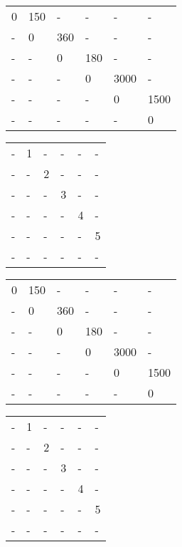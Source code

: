\documentclass[11pt]{article}
\begin{document}
\begin{sol}
\begin{table*}[htbp]
	\centering
	\begin{tabular}{|l|l|l|l|l|l|}
		 \hline
        0 & 150 & - & - & - & - \\ 
        - & 0 & 360 & - & - & - \\ 
        - & - & 0 & 180 & - & - \\ 
        - & - & - & 0 & 3000 & -\\ 
        - & - & - & - & 0 & 1500  \\ 
        - & - & - & - & - & 0 \\
        \hline
	\end{tabular}
	\hspace{20mm}
	\begin{tabular}{|l|l|l|l|l|l|}
		 \hline
        - & 1 & - & - & - & - \\ 
        - & - & 2 & - & - & - \\ 
        - & - & - & 3 & - & - \\ 
        - & - & - & - & 4 & - \\ 
        - & - & - & - & - & 5 \\ 
        - & - & - & - & - & - \\
        \hline
	\end{tabular}
	\caption{$m$ and $c$ tables for $l = 2$}
\end{table*}

\begin{table*}[htbp]
	\centering
	\begin{tabular}{|l|l|l|l|l|l|}
		 \hline
        0 & 150 & - & - & - & - \\ 
        - & 0 & 360 & - & - & - \\ 
        - & - & 0 & 180 & - & - \\ 
        - & - & - & 0 & 3000 & -\\ 
        - & - & - & - & 0 & 1500  \\ 
        - & - & - & - & - & 0 \\
        \hline
	\end{tabular}
	\hspace{20mm}
	\begin{tabular}{|l|l|l|l|l|l|}
		 \hline
        - & 1 & - & - & - & - \\ 
        - & - & 2 & - & - & - \\ 
        - & - & - & 3 & - & - \\ 
        - & - & - & - & 4 & - \\ 
        - & - & - & - & - & 5 \\ 
        - & - & - & - & - & - \\
        \hline
	\end{tabular}
	\caption{$m$ and $c$ tables for $l = 3$}
\end{table*}

\end{sol}
\end{document}
